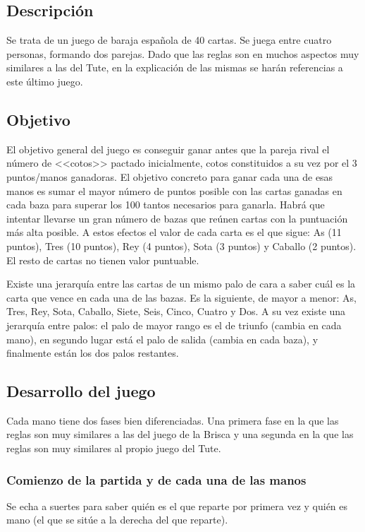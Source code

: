 \documentclass{article}
\begin{document}
\subsection*{Descripción}
Se trata de un juego de baraja española de 40 cartas. Se juega entre cuatro personas, formando dos parejas. Dado que las reglas son en muchos aspectos muy similares a las del Tute, en la explicación de las mismas se harán referencias a este último juego.

\subsection*{Objetivo}
El objetivo general del juego es conseguir ganar antes que la pareja rival el número de <<cotos>> pactado inicialmente, cotos constituidos a su vez por el 3 puntos/manos ganadoras. El objetivo concreto para ganar cada una de esas manos es sumar el mayor número de puntos posible con las cartas ganadas en cada baza para superar los 100 tantos necesarios para ganarla. Habrá que intentar llevarse un gran número de bazas que reúnen cartas con la puntuación más alta posible. A estos efectos el valor de cada carta es el que sigue: As (11 puntos), Tres (10 puntos), Rey (4 puntos), Sota (3 puntos) y Caballo (2 puntos). El resto de cartas no tienen valor puntuable.

Existe una jerarquía entre las cartas de un mismo palo de cara a saber cuál es la carta que vence en cada una de las bazas. Es la siguiente, de mayor a menor: As, Tres, Rey, Sota, Caballo, Siete, Seis, Cinco, Cuatro y Dos. A su vez existe una jerarquía entre palos: el palo de mayor rango es el de triunfo (cambia en cada mano), en segundo lugar está el palo de salida (cambia en cada baza), y finalmente están los dos palos restantes.

\subsection*{Desarrollo del juego}
Cada mano tiene dos fases bien diferenciadas. Una primera fase en la que las reglas son muy similares a las del juego de la Brisca y una segunda en la que las reglas son muy similares al propio juego del Tute.
\subsubsection*{Comienzo de la partida y de cada una de las manos}
Se echa a suertes para saber quién es el que reparte por primera vez y quién es mano (el que se sitúe a la derecha del que reparte).
\end{document}
